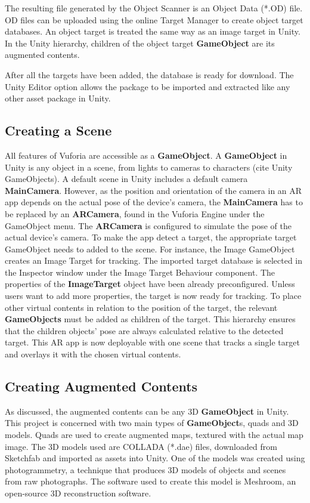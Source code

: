 The resulting file generated by the Object Scanner is an Object Data (*.OD) file. OD files can be uploaded using the online Target Manager to create object target databases. An object target is treated the same way as an image target in Unity. In the Unity hierarchy, children of the object target \textbf{GameObject} are its augmented contents.

After all the targets have been added, the database is ready for download. The Unity Editor option allows the package to be imported and extracted like any other asset package in Unity.

\subsection{Creating a Scene}
All features of Vuforia are accessible as a \textbf{GameObject}. A \textbf{GameObject} in Unity is any object in a scene, from lights to cameras to characters (cite Unity GameObjects). A default scene in Unity includes a default camera \textbf{MainCamera}. However, as the position and orientation of the camera in an AR app depends on the actual pose of the device's camera, the \textbf{MainCamera} has to be replaced by an \textbf{ARCamera}, found in the Vuforia Engine under the GameObject menu. The \textbf{ARCamera} is configured to simulate the pose of the actual device's camera. To make the app detect a target, the appropriate target GameObject needs to added to the scene. For instance, the Image GameObject creates an Image Target for tracking. The imported target database is selected in the Inspector window under the Image Target Behaviour component. The properties of the \textbf{ImageTarget} object have been already preconfigured. Unless users want to add more properties, the target is now ready for tracking. To place other virtual contents in relation to the position of the target,  the relevant \textbf{GameObjects} must be added as children of the target. This hierarchy ensures that the children objects' pose are always calculated relative to the detected target. This AR app is now deployable with one scene that tracks a single target and overlays it with the chosen virtual contents.

\subsection{Creating Augmented Contents}
As discussed, the augmented contents can be any 3D \textbf{GameObject} in Unity. This project is concerned with two main types of \textbf{GameObject}s, quads and 3D models. Quads are used to create augmented maps, textured with the actual map image. The 3D models used are COLLADA (*.dae) files, downloaded from Sketchfab and imported as assets into Unity. One of the models was created using photogrammetry, a technique that produces 3D models of objects and scenes from raw photographs. The software used to create this model is Meshroom, an open-source 3D reconstruction software.